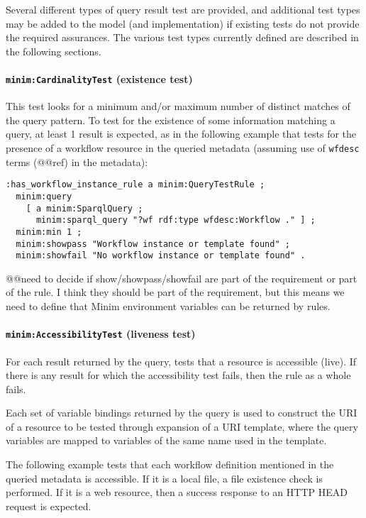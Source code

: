 \documentclass[]{article}
\begin{document}
Several different types of query result test are provided, and
additional test types may be added to the model (and implementation) if
existing tests do not provide the required assurances. The various test
types currently defined are described in the following sections.

\paragraph{\texttt{minim:CardinalityTest} (existence test)}

This test looks for a minimum and/or maximum number of distinct matches
of the query pattern. To test for the existence of some information
matching a query, at least 1 result is expected, as in the following
example that tests for the presence of a workflow resource in the
queried metadata (assuming use of \texttt{wfdesc} terms (@@ref) in the
metadata):

\begin{verbatim}
:has_workflow_instance_rule a minim:QueryTestRule ;
  minim:query 
    [ a minim:SparqlQuery ; 
      minim:sparql_query "?wf rdf:type wfdesc:Workflow ." ] ;
  minim:min 1 ;
  minim:showpass "Workflow instance or template found" ;
  minim:showfail "No workflow instance or template found" .
\end{verbatim}

@@need to decide if show/showpass/showfail are part of the requirement
or part of the rule. I think they should be part of the requirement, but
this means we need to define that Minim environment variables can be
returned by rules.

\paragraph{\texttt{minim:AccessibilityTest} (liveness test)}

For each result returned by the query, tests that a resource is
accessible (live). If there is any result for which the accessibility
test fails, then the rule as a whole fails.

Each set of variable bindings returned by the query is used to construct
the URI of a resource to be tested through expansion of a URI template,
where the query variables are mapped to variables of the same name used
in the template.

The following example tests that each workflow definition mentioned in
the queried metadata is accessible. If it is a local file, a file
existence check is performed. If it is a web resource, then a success
response to an HTTP HEAD request is expected.
\end{document}
